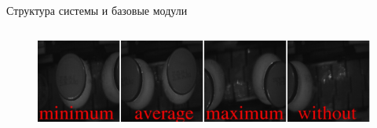 \documentclass[10pt]{beamer}
\begin{document}
\begin{frame}{Структура системы и базовые модули}
\begin{columns}
\begin{column}{0.6\textwidth}
\begin{figure}
                    \end{figure}
                    \begin{figure}
                        \centering
                        \includegraphics[width=\textwidth]{pic4-24.jpeg}
                    \end{figure}
                \end{column}
            \end{columns}
        \end{frame}
\end{document}
